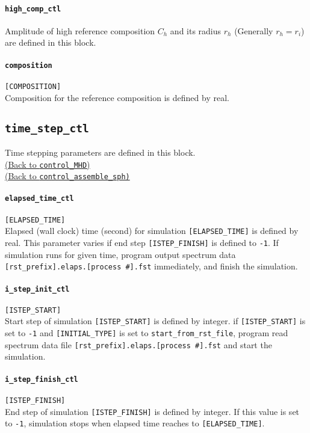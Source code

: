 \paragraph{\tt high\_comp\_ctl}
\label{href_t:high_comp_ctl}
Amplitude of high reference composition $C_{h}$ and its radius $r_{h}$ (Generally $r_{h} = r_{i}$) are defined in this block.

\paragraph{\tt composition}
\label{href_t:composition}
\verb|[COMPOSITION]| \\
Composition for the reference composition is defined by real.


\subsection{\tt time\_step\_ctl}
\label{href_t:time_step_ctl}
Time stepping parameters are defined in this block. \\
\hyperref[href_i:time_step_ctl]{(Back to {\tt control\_MHD})} \\
\hyperref[href_i:time_step_ctl2]{(Back to {\tt control\_assemble\_sph)}}

\paragraph{\tt elapsed\_time\_ctl}
\label{href_t:elapsed_time_ctl}
\verb|[ELAPSED_TIME]| \\
Elapsed (wall clock) time (second) for simulation \verb|[ELAPSED_TIME]| is defined by real. 
This parameter varies if end step \verb|[ISTEP_FINISH]| is defined to {\tt -1}. If simulation runs for given time, program output spectrum data  \verb|[rst_prefix].elaps.[process #].fst| immediately, and finish the simulation.

\paragraph{\tt i\_step\_init\_ctl}
\label{href_t:i_step_init_ctl}
\verb|[ISTEP_START]| \\
Start step of simulation \verb|[ISTEP_START]| is defined by integer. if \verb|[ISTEP_START]| is set to {\tt -1} and \verb|[INITIAL_TYPE]| is set to \verb|start_from_rst_file|, program read spectrum data file \verb|[rst_prefix].elaps.[process #].fst| and start the simulation.

\paragraph{\tt i\_step\_finish\_ctl}
\label{href_t:i_step_finish_ctl}
\verb|[ISTEP_FINISH]| \\
End step of simulation \verb|[ISTEP_FINISH]| is defined by integer. If this value is set to  {\tt -1}, simulation stops when elapsed time reaches to \verb|[ELAPSED_TIME]|.


